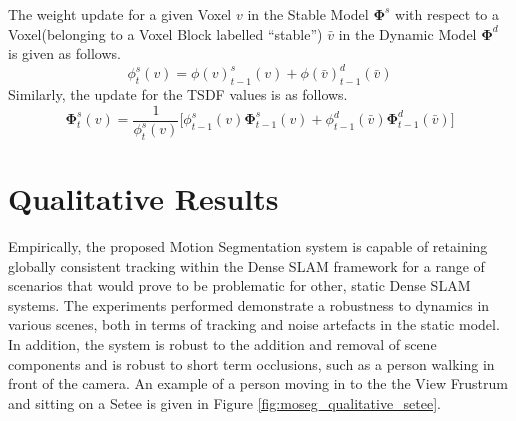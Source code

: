 The weight update for a given Voxel $v$ in the Stable Model $\mathbf{\Phi}^{s}$
with respect to a Voxel(belonging to a Voxel Block labelled ``stable'') 
$\bar{v}$ in the Dynamic Model $\mathbf{\Phi}^{d}$ is given as follows.
\begin{equation}
  \label{eqn:moseg_weight_update}
  \phi^{s}_{t}(v) = \phi(v)^{s}_{t-1}(v) + \phi(\bar{v})^{d}_{t-1}(\bar{v})
\end{equation}
Similarly, the update for the TSDF values is as follows.
\begin{equation}
  \label{eqn:moseg_sdf_update}
  \mathbf{\Phi}^{s}_{t}(v) = \frac{1}{\phi^{s}_{t}(v)} \bigg[
  \phi^{s}_{t-1}(v) \mathbf{\Phi}^{s}_{t-1}(v) +
  \phi^{d}_{t-1}(\bar{v}) \mathbf{\Phi}^{d}_{t-1}(\bar{v})
  \bigg]
\end{equation}

\section{Qualitative Results}
\label{sec:moseg_qualitative}
Empirically, the proposed Motion Segmentation system is capable of retaining
globally consistent tracking within the Dense SLAM framework for a range of
scenarios that would prove to be problematic for other, static Dense SLAM
systems. The experiments performed demonstrate a robustness	to dynamics in
various scenes, both in terms of tracking and noise artefacts in the static
model. In addition, the system is robust to the addition and removal of scene
components and is robust to short term occlusions, such as a person walking in
front of the camera. An example of a person moving in to the the View Frustrum
and sitting on a Setee is given in Figure \ref{fig:moseg_qualitative_setee}.

